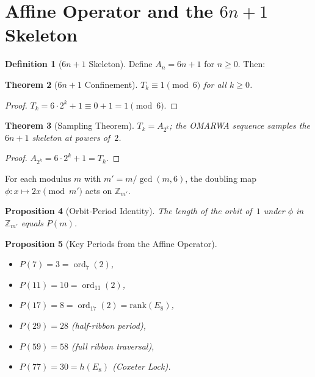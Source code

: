 \documentclass[11pt, a4paper]{article}
\theoremstyle{plain}
\newtheorem{theorem}{Theorem}[section]
\newtheorem{proposition}[theorem]{Proposition}
\theoremstyle{definition}
\newtheorem{definition}[theorem]{Definition}
\theoremstyle{remark}
\newcommand{\ord}{\operatorname{ord}}
\begin{document}
\section{Affine Operator and the \texorpdfstring{$6n{+}1$}{6n+1}
  Skeleton}\label{sec:affine}

\begin{definition}[$6n{+}1$ Skeleton]\label{def:skeleton}
Define $A_n = 6n + 1$ for $n \geq 0$. Then:
\end{definition}

\begin{theorem}[$6n{+}1$ Confinement]\label{thm:confinement}
$T_k \equiv 1 \pmod{6}$ for all $k \geq 0$.
\end{theorem}

\begin{proof}
$T_k = 6 \cdot 2^k + 1 \equiv 0 + 1 = 1 \pmod{6}$.
\end{proof}

\begin{theorem}[Sampling Theorem]\label{thm:sampling}
$T_k = A_{2^k}$; the OMARWA sequence samples the $6n{+}1$ skeleton at
powers of~$2$.
\end{theorem}

\begin{proof}
$A_{2^k} = 6 \cdot 2^k + 1 = T_k$.
\end{proof}

For each modulus $m$ with $m' = m/\gcd(m,6)$, the doubling map
$\phi : x \mapsto 2x \pmod{m'}$ acts on $\mathbb{Z}_{m'}$.

\begin{proposition}[Orbit-Period Identity]\label{prop:orbit}
The length of the orbit of~$1$ under $\phi$ in
$\mathbb{Z}_{m'}$ equals $P(m)$.
\end{proposition}

\begin{proposition}[Key Periods from the Affine Operator]\label{prop:key-periods}
\leavevmode
\begin{itemize}
  \item $P(7) = 3 = \ord_7(2)$,
  \item $P(11) = 10 = \ord_{11}(2)$,
  \item $P(17) = 8 = \ord_{17}(2) = \mathrm{rank}(E_8)$,
  \item $P(29) = 28$ (half-ribbon period),
  \item $P(59) = 58$ (full ribbon traversal),
  \item $P(77) = 30 = h(E_8)$ (Coxeter Lock).
\end{itemize}
\end{proposition}
\end{document}

